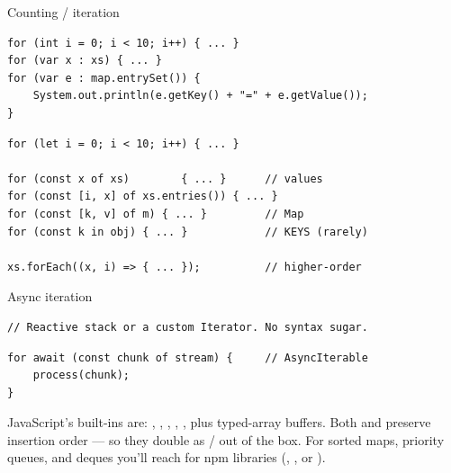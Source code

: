 \documentclass[10pt]{article}
\begin{document}
\begin{construct}{Counting / iteration}
\noindent
\begin{minipage}[t]{0.485\linewidth}
\begin{lstlisting}[style=java, title=Java]
for (int i = 0; i < 10; i++) { ... }
for (var x : xs) { ... }
for (var e : map.entrySet()) {
    System.out.println(e.getKey() + "=" + e.getValue());
}
\end{lstlisting}
\end{minipage}\hfill
\begin{minipage}[t]{0.485\linewidth}
\begin{lstlisting}[style=ts, title=TypeScript]
for (let i = 0; i < 10; i++) { ... }

for (const x of xs)        { ... }      // values
for (const [i, x] of xs.entries()) { ... }
for (const [k, v] of m) { ... }         // Map
for (const k in obj) { ... }            // KEYS (rarely)

xs.forEach((x, i) => { ... });          // higher-order
\end{lstlisting}
\end{minipage}
\end{construct}

\begin{construct}{Async iteration}
\noindent
\begin{minipage}[t]{0.485\linewidth}
\begin{lstlisting}[style=java, title=Java]
// Reactive stack or a custom Iterator. No syntax sugar.
\end{lstlisting}
\end{minipage}\hfill
\begin{minipage}[t]{0.485\linewidth}
\begin{lstlisting}[style=ts, title=TypeScript]
for await (const chunk of stream) {     // AsyncIterable
    process(chunk);
}
\end{lstlisting}
\end{minipage}
\end{construct}


JavaScript's built-ins are: , , ,
, , plus typed-array buffers. Both  and
 preserve insertion order --- so they double as
/ out of the box. For sorted maps,
priority queues, and deques you'll reach for npm libraries (,
, or ).
\end{document}
